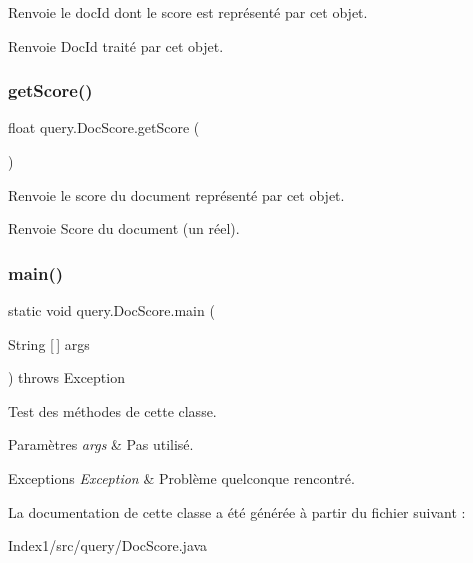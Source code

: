 Renvoie le doc\+Id dont le score est représenté par cet objet.

\begin{DoxyReturn}{Renvoie}
Doc\+Id traité par cet objet. 
\end{DoxyReturn}
\mbox{\label{classquery_1_1DocScore_a0d91b05afa65f26024148990787ff146}} 
\subsubsection{\texorpdfstring{get\+Score()}{getScore()}}
{\footnotesize\ttfamily float query.\+Doc\+Score.\+get\+Score (\begin{DoxyParamCaption}{ }\end{DoxyParamCaption})}

Renvoie le score du document représenté par cet objet.

\begin{DoxyReturn}{Renvoie}
Score du document (un réel). 
\end{DoxyReturn}
\mbox{\label{classquery_1_1DocScore_ab28f1cd5999cd2497715886c35aaf33f}} 
\subsubsection{\texorpdfstring{main()}{main()}}
{\footnotesize\ttfamily static void query.\+Doc\+Score.\+main (\begin{DoxyParamCaption}\item[{String \mbox{[}$\,$\mbox{]}}]{args }\end{DoxyParamCaption}) throws Exception\hspace{0.3cm}{\ttfamily [static]}}

Test des méthodes de cette classe.


\begin{DoxyParams}{Paramètres}
{\em args} & Pas utilisé.\\
\hline
\end{DoxyParams}

\begin{DoxyExceptions}{Exceptions}
{\em Exception} & Problème quelconque rencontré. \\
\hline
\end{DoxyExceptions}


La documentation de cette classe a été générée à partir du fichier suivant \+:\begin{DoxyCompactItemize}
\item 
Index1/src/query/Doc\+Score.\+java\end{DoxyCompactItemize}
